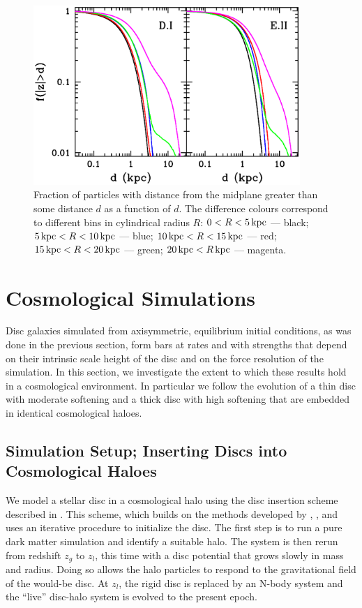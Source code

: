 \begin{figure}
	\centering
	\includegraphics[width=0.9\textwidth]{../figures/kicked_up_disk.eps}
	\caption{Fraction of particles with distance from the midplane greater
than some distance $d$ as a function of $d$.  The difference colours correspond to
different bins in cylindrical radius $R$: $0<R<5\,{\rm kpc}$ --- black;
$5\,{\rm kpc} < R < 10\,{\rm kpc}$ --- blue;
$10\,{\rm kpc} < R < 15\,{\rm kpc}$ --- red;
$15\,{\rm kpc} < R < 20\,{\rm kpc}$ --- green;
$20\,{\rm kpc} < R\,{\rm kpc}$ --- magenta.}
 \label{fig:kicked_up_disc}
\end{figure}

\section{Cosmological Simulations} \label{sec:cosmo}

Disc galaxies simulated from axisymmetric, equilibrium initial
conditions, as was done in the previous section, form bars at rates
and with strengths that depend on their intrinsic scale height of the
disc and on the force resolution of the simulation. In this section,
we investigate the extent to which these results hold in a
cosmological environment.  In particular we follow the evolution of a
thin disc with moderate softening and a thick disc with high softening
that are embedded in identical cosmological haloes.

\subsection{Simulation Setup; Inserting Discs into Cosmological Haloes}

We model a stellar disc in a cosmological halo using the disc
insertion scheme described in \citet{Bauer2018a}.  This scheme, which
builds on the methods developed by
\citet{BerentzenShlosmanStellarDisks}, \citet{DeBuhrStellarDisks}, and
\citet{YurinSpringelStellarDisks} uses an iterative procedure to
initialize the disc.  The first step is to run a pure dark matter
simulation and identify a suitable halo.  The system is then rerun
from redshift $z_g$ to $z_l$, this time with a disc potential that
grows slowly in mass and radius.  Doing so allows the halo particles
to respond to the gravitational field of the would-be disc.  At $z_l$,
the rigid disc is replaced by an N-body system and the ``live'' disc-halo
system is evolved to the present epoch.

